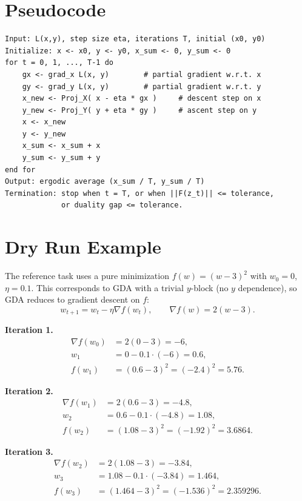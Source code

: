 \documentclass[11pt]{article}
\begin{document}
\section*{Pseudocode}

\begin{verbatim}
Input: L(x,y), step size eta, iterations T, initial (x0, y0)
Initialize: x <- x0, y <- y0, x_sum <- 0, y_sum <- 0
for t = 0, 1, ..., T-1 do
    gx <- grad_x L(x, y)        # partial gradient w.r.t. x
    gy <- grad_y L(x, y)        # partial gradient w.r.t. y
    x_new <- Proj_X( x - eta * gx )     # descent step on x
    y_new <- Proj_Y( y + eta * gy )     # ascent step on y
    x <- x_new
    y <- y_new
    x_sum <- x_sum + x
    y_sum <- y_sum + y
end for
Output: ergodic average (x_sum / T, y_sum / T)
Termination: stop when t = T, or when ||F(z_t)|| <= tolerance,
             or duality gap <= tolerance.
\end{verbatim}

\section*{Dry Run Example}

The reference task uses a pure minimization $f(w)=(w-3)^2$ with $w_0=0$,
$\eta=0.1$. This corresponds to GDA with a trivial $y$-block (no $y$
dependence), so GDA reduces to gradient descent on $f$:
\[
w_{t+1} = w_t - \eta \nabla f(w_t), \qquad \nabla f(w) = 2(w-3).
\]

\textbf{Iteration 1.}
\begin{align*}
\nabla f(w_0) &= 2(0-3) = -6, \\
w_1 &= 0 - 0.1\cdot(-6) = 0.6, \\
f(w_1) &= (0.6-3)^2 = (-2.4)^2 = 5.76.
\end{align*}

\textbf{Iteration 2.}
\begin{align*}
\nabla f(w_1) &= 2(0.6-3) = -4.8, \\
w_2 &= 0.6 - 0.1\cdot(-4.8) = 1.08, \\
f(w_2) &= (1.08-3)^2 = (-1.92)^2 = 3.6864.
\end{align*}

\textbf{Iteration 3.}
\begin{align*}
\nabla f(w_2) &= 2(1.08-3) = -3.84, \\
w_3 &= 1.08 - 0.1\cdot(-3.84) = 1.464, \\
f(w_3) &= (1.464-3)^2 = (-1.536)^2 = 2.359296.
\end{align*}
\end{document}
